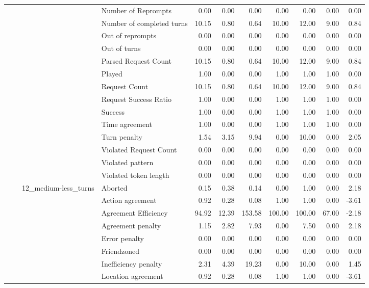 \begin{tabular}{llllrrrrrrr}
 &  &  & Number of Reprompts & 0.00 & 0.00 & 0.00 & 0.00 & 0.00 & 0.00 & 0.00 \\
 &  &  & Number of completed turns & 10.15 & 0.80 & 0.64 & 10.00 & 12.00 & 9.00 & 0.84 \\
 &  &  & Out of reprompts & 0.00 & 0.00 & 0.00 & 0.00 & 0.00 & 0.00 & 0.00 \\
 &  &  & Out of turns & 0.00 & 0.00 & 0.00 & 0.00 & 0.00 & 0.00 & 0.00 \\
 &  &  & Parsed Request Count & 10.15 & 0.80 & 0.64 & 10.00 & 12.00 & 9.00 & 0.84 \\
 &  &  & Played & 1.00 & 0.00 & 0.00 & 1.00 & 1.00 & 1.00 & 0.00 \\
 &  &  & Request Count & 10.15 & 0.80 & 0.64 & 10.00 & 12.00 & 9.00 & 0.84 \\
 &  &  & Request Success Ratio & 1.00 & 0.00 & 0.00 & 1.00 & 1.00 & 1.00 & 0.00 \\
 &  &  & Success & 1.00 & 0.00 & 0.00 & 1.00 & 1.00 & 1.00 & 0.00 \\
 &  &  & Time agreement & 1.00 & 0.00 & 0.00 & 1.00 & 1.00 & 1.00 & 0.00 \\
 &  &  & Turn penalty & 1.54 & 3.15 & 9.94 & 0.00 & 10.00 & 0.00 & 2.05 \\
 &  &  & Violated Request Count & 0.00 & 0.00 & 0.00 & 0.00 & 0.00 & 0.00 & 0.00 \\
 &  &  & Violated pattern & 0.00 & 0.00 & 0.00 & 0.00 & 0.00 & 0.00 & 0.00 \\
 &  &  & Violated token length & 0.00 & 0.00 & 0.00 & 0.00 & 0.00 & 0.00 & 0.00 \\
\cline{3-11}
 &  & \multirow[t]{27}{*}{12_medium-less_turns} & Aborted & 0.15 & 0.38 & 0.14 & 0.00 & 1.00 & 0.00 & 2.18 \\
 &  &  & Action agreement & 0.92 & 0.28 & 0.08 & 1.00 & 1.00 & 0.00 & -3.61 \\
 &  &  & Agreement Efficiency & 94.92 & 12.39 & 153.58 & 100.00 & 100.00 & 67.00 & -2.18 \\
 &  &  & Agreement penalty & 1.15 & 2.82 & 7.93 & 0.00 & 7.50 & 0.00 & 2.18 \\
 &  &  & Error penalty & 0.00 & 0.00 & 0.00 & 0.00 & 0.00 & 0.00 & 0.00 \\
 &  &  & Friendzoned & 0.00 & 0.00 & 0.00 & 0.00 & 0.00 & 0.00 & 0.00 \\
 &  &  & Inefficiency penalty & 2.31 & 4.39 & 19.23 & 0.00 & 10.00 & 0.00 & 1.45 \\
 &  &  & Location agreement & 0.92 & 0.28 & 0.08 & 1.00 & 1.00 & 0.00 & -3.61 \\

\end{tabular}

